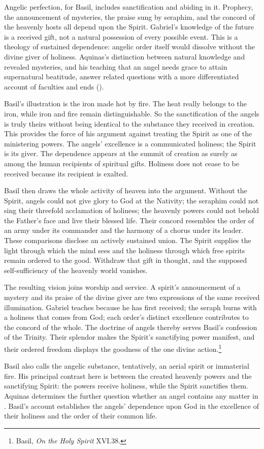 Angelic perfection, for Basil, includes sanctification and abiding in it. Prophecy, the announcement of mysteries, the praise sung by seraphim, and the concord of the heavenly hosts all depend upon the Spirit. Gabriel's knowledge of the future is a received gift, not a natural possession of every possible event. This is a theology of sustained dependence: angelic order itself would dissolve without the divine giver of holiness. Aquinas's distinction between natural knowledge and revealed mysteries, and his teaching that an angel needs grace to attain supernatural beatitude, answer related questions with a more differentiated account of faculties and ends ().


Basil's illustration is the iron made hot by fire. The heat really belongs to the iron, while iron and fire remain distinguishable. So the sanctification of the angels is truly theirs without being identical to the substance they received in creation. This provides the force of his argument against treating the Spirit as one of the ministering powers. The angels' excellence is a communicated holiness; the Spirit is its giver. The dependence appears at the summit of creation as surely as among the human recipients of spiritual gifts. Holiness does not cease to be received because its recipient is exalted.

Basil then draws the whole activity of heaven into the argument. Without the Spirit, angels could not give glory to God at the Nativity; the seraphim could not sing their threefold acclamation of holiness; the heavenly powers could not behold the Father's face and live their blessed life. Their concord resembles the order of an army under its commander and the harmony of a chorus under its leader. These comparisons disclose an actively sustained union. The Spirit supplies the light through which the mind sees and the holiness through which free spirits remain ordered to the good. Withdraw that gift in thought, and the supposed self-sufficiency of the heavenly world vanishes.

The resulting vision joins worship and service. A spirit's announcement of a mystery and its praise of the divine giver are two expressions of the same received illumination. Gabriel teaches because he has first received; the seraph burns with a holiness that comes from God; each order's distinct excellence contributes to the concord of the whole. The doctrine of angels thereby serves Basil's confession of the Trinity. Their splendor makes the Spirit's sanctifying power manifest, and their ordered freedom displays the goodness of the one divine action.\footnote{Basil, \emph{On the Holy Spirit} XVI.38.}

Basil also calls the angelic substance, tentatively, an aerial spirit or immaterial fire. His principal contrast here is between the created heavenly powers and the sanctifying Spirit: the powers receive holiness, while the Spirit sanctifies them. Aquinas determines the further question whether an angel contains any matter in . Basil's account establishes the angels' dependence upon God in the excellence of their holiness and the order of their common life.
